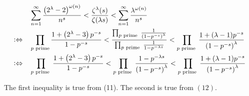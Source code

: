 \documentclass{article}
\newcommand\logeq{\mathrel{\vcentcolon\Leftrightarrow}}
\begin{document}
\begin{solution}
$$
\begin{aligned}
&\sum_{n=1}^{\infty} \frac{\left(2^\lambda-2\right)^{\omega(n)}}{n^s}<\frac{\zeta^\lambda(s)}{\zeta(\lambda s)}<\sum_{n=1}^{\infty} \frac{\lambda^{\omega(n)}}{n^s}\\
 \logeq \quad &\prod_{p \text{ prime}} \frac{1+\left(2^\lambda-3\right) p^{-s}}{1-p^{-s}}<\frac{\prod_{p \text { prime }} \frac{1}{\left(1-p^{-s}\right)^\lambda}}{\prod_{p \text { prime }} \frac{1}{1-p^{-\lambda s}}}<\prod_{p \text { prime }} \frac{1+(\lambda-1) p^{-s}}{\left(1-p^{-s}\right)^\lambda} \\
 \logeq \quad &\prod_{p \text { prime }} \frac{1+\left(2^\lambda-3\right) p^{-s}}{1-p^{-s}}<\prod_{p \text { prime }} \frac{1-p^{-\lambda s}}{\left(1-p^{-s}\right)^\lambda}<\prod_{p \text { prime }} \frac{1+(\lambda-1) p^{-s}}{\left(1-p^{-s}\right)^\lambda}
\end{aligned}
$$

The first inequality is true from (11). The second is true from $(12)$.
\end{solution}
\end{document}
